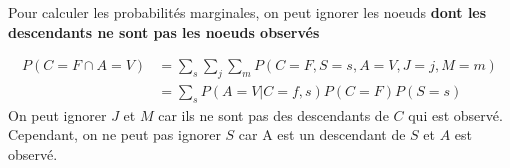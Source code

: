 Pour calculer les probabilités marginales, on peut ignorer les noeuds 
\textbf{dont les descendants ne sont pas les noeuds observés}

\begin{example}\leavevmode
    \begin{align*}
        P(C=F \cap A=V) &= \sum_{s} \sum_{j} \sum_{m} P(C=F, S=s, A=V, J=j, M=m) \\
                        &= \sum_{s} P(A=V | C=f, s) P(C=F) P(S=s) 
    \end{align*}
    On peut ignorer $J$ et $M$ car ils ne sont pas des descendants de $C$ qui est observé.
    Cependant, on ne peut pas ignorer $S$ car A est un descendant de $S$ et $A$ est observé.
\end{example}
